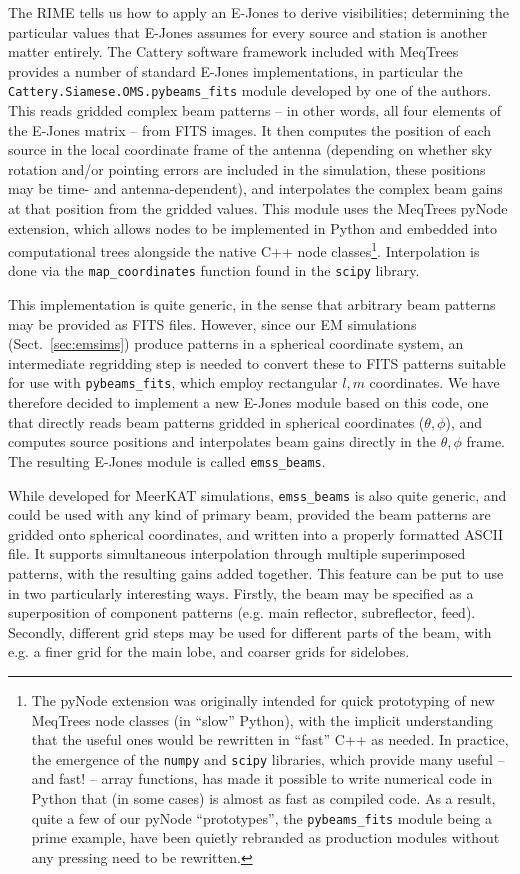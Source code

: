 \documentclass{aa}
\begin{document}
The RIME tells us how to apply an E-Jones to derive visibilities; determining the particular values that 
E-Jones assumes for every source and station is another matter entirely. The Cattery software framework included with MeqTrees provides a number of standard E-Jones implementations, in particular the
{\tt Cattery.Siamese.OMS.pybeams\_fits} module developed by one of the authors. This reads gridded complex beam patterns -- in other words, all four elements of the E-Jones matrix -- from FITS images. It then computes the position of each source in the local coordinate frame of the antenna (depending on whether sky rotation and/or pointing errors are included in the simulation, these positions may be time- and antenna-dependent), and interpolates the complex beam gains at that position from the gridded values. This module uses the MeqTrees pyNode extension, which allows nodes to be implemented in Python and embedded into computational trees alongside the native C++ node classes\footnote{The pyNode extension was originally intended for quick prototyping of new MeqTrees node classes (in ``slow'' Python), with the implicit understanding that the useful ones would be rewritten in ``fast'' C++ as needed. In practice, the emergence of the {\tt numpy} and {\tt scipy} libraries, which provide many useful -- and fast!
 -- array functions, has made it possible to write numerical code in Python that (in some cases) is almost as fast as compiled code. As a result, quite a few of our pyNode ``prototypes'', the {\tt pybeams\_fits} module being a prime example, have been quietly rebranded as production modules without any pressing need to be rewritten.}. Interpolation is done via the {\tt map\_coordinates} function found in the {\tt scipy} library. 

This implementation is quite generic, in the sense that arbitrary beam patterns may be provided as FITS files. However, since our EM simulations (Sect.~\ref{sec:emsims}) produce patterns in a spherical coordinate system, an intermediate regridding step is needed to convert these to FITS patterns suitable for use with {\tt pybeams\_fits}, which employ rectangular $l,m$ coordinates. We have therefore decided to implement a new E-Jones module based on this code, one that directly reads beam patterns gridded in spherical coordinates ($\theta,\phi$), and computes source positions and interpolates beam gains directly in the $\theta,\phi$ frame. The resulting E-Jones module is called {\tt emss\_beams}.

While developed for MeerKAT simulations, {\tt emss\_beams} is also quite generic, and could be used with any kind of primary beam, provided the beam patterns are gridded onto spherical coordinates, and written into a properly formatted ASCII file. It supports simultaneous interpolation through multiple superimposed patterns, with the resulting gains added together. This feature can be put to use in two particularly interesting ways. Firstly, the beam may be specified as a superposition of component patterns (e.g. main reflector, subreflector, feed). Secondly, different grid steps may be used for different parts of the beam, with e.g. a finer grid for the main lobe, and coarser grids for sidelobes. 
\end{document}
